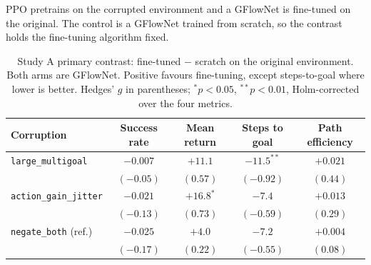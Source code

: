 PPO pretrains on the corrupted environment and a GFlowNet is fine-tuned on the
original. The control is a GFlowNet trained from scratch, so the contrast holds
the fine-tuning algorithm fixed.

\begin{table}[htbp]
\centering
\setlength{\tabcolsep}{4pt}
\caption{Study A primary contrast: fine-tuned $-$ scratch on the original
environment. Both arms are GFlowNet. Positive favours fine-tuning, except
steps-to-goal where lower is better. Hedges' $g$ in parentheses;
${}^{*}p<0.05$, ${}^{**}p<0.01$, Holm-corrected over the four metrics.}
\small
\begin{tabular}{lcccc}
\toprule
Corruption & Success rate & Mean return & Steps to goal & Path efficiency \\
\midrule
\texttt{large\_multigoal} & $-0.007$ & $+11.1$ & $-11.5^{**}$ & $+0.021$ \\
 & \footnotesize$(-0.05)$ & \footnotesize$(0.57)$ & \footnotesize$(-0.92)$ & \footnotesize$(0.44)$ \\[3pt]
\texttt{action\_gain\_jitter} & $-0.021$ & $+16.8^{*}$ & $-7.4$ & $+0.013$ \\
 & \footnotesize$(-0.13)$ & \footnotesize$(0.73)$ & \footnotesize$(-0.59)$ & \footnotesize$(0.29)$ \\[3pt]
\texttt{negate\_both} (ref.) & $-0.025$ & $+4.0$ & $-7.2$ & $+0.004$ \\
 & \footnotesize$(-0.17)$ & \footnotesize$(0.22)$ & \footnotesize$(-0.55)$ & \footnotesize$(0.08)$ \\
\bottomrule
\end{tabular}
\end{table}


